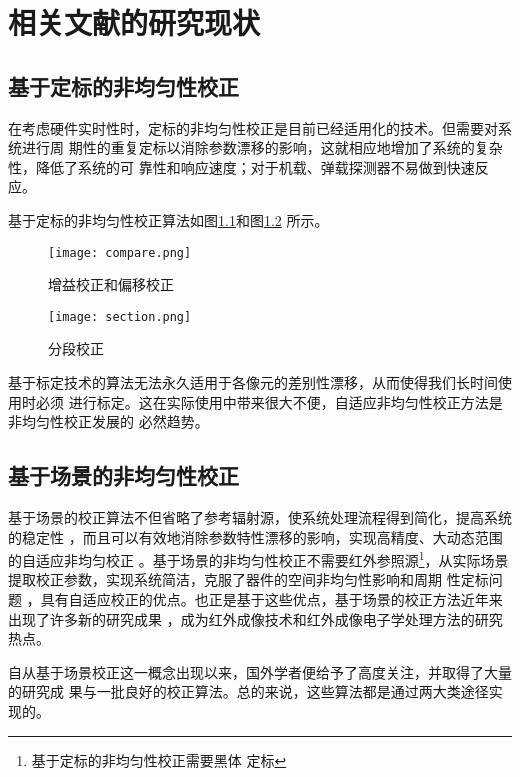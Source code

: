 \documentclass[../main]{subfiles}
\begin{document}
\chapter{相关文献的研究现状}%
\label{cha:相关文献的研究现状}

\section{基于定标的非均匀性校正}%
\label{sec:基于定标的非均匀性校正}

在考虑硬件实时性时，定标的非均匀性校正是目前已经适用化的技术。但需要对系统进行周
期性的重复定标以消除参数漂移的影响，这就相应地增加了系统的复杂性，降低了系统的可
靠性和响应速度；对于机载、弹载探测器不易做到快速反应。

基于定标的非均匀性校正算法如图\ref{fig:增益校正和偏移校正}和图\ref{fig:分段校正}
所示。

\begin{figure}[htbp]
	\centering
	\texttt{[image: compare.png]}
	\caption{增益校正和偏移校正}
	\label{fig:增益校正和偏移校正}
\end{figure}

\begin{figure}[htbp]
	\centering
	\texttt{[image: section.png]}
	\caption{分段校正}
	\label{fig:分段校正}
\end{figure}

基于标定技术的算法无法永久适用于各像元的差别性漂移，从而使得我们长时间使用时必须
进行标定。这在实际使用中带来很大不便，自适应非均匀性校正方法是非均匀性校正发展的
必然趋势。

\section{基于场景的非均匀性校正}%
\label{sec:基于场景的非均匀性校正}

基于场景的校正算法不但省略了参考辐射源，使系统处理流程得到简化，提高系统的稳定性
，而且可以有效地消除参数特性漂移的影响，实现高精度、大动态范围的自适应非均匀校正
。基于场景的非均匀性校正不需要红外参照源\footnote{基于定标的非均匀性校正需要黑体
定标}，从实际场景提取校正参数，实现系统简洁，克服了器件的空间非均匀性影响和周期
性定标问题 ，具有自适应校正的优点。也正是基于这些优点，基于场景的校正方法近年来
出现了许多新的研究成果 ，成为红外成像技术和红外成像电子学处理方法的研究热点。

自从基于场景校正这一概念出现以来，国外学者便给予了高度关注，并取得了大量的研究成
果与一批良好的校正算法。总的来说，这些算法都是通过两大类途径实现的。
\end{document}
